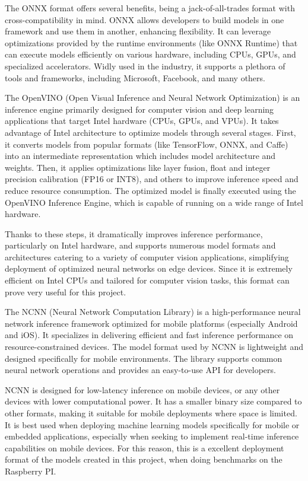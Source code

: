 \documentclass[12pt]{article}
\begin{document}
The ONNX format offers several benefits, being a jack-of-all-trades format with cross-compatibility in mind. ONNX allows developers to build models in one framework and use them in another, enhancing flexibility. It can leverage optimizations provided by the runtime environments (like ONNX Runtime) that can execute models efficiently on various hardware, including CPUs, GPUs, and specialized accelerators. Widly used in the industry, it supports a plethora of tools and frameworks, including Microsoft, Facebook, and many others.

The OpenVINO (Open Visual Inference and Neural Network Optimization) is an inference engine primarily designed for computer vision and deep learning applications that target Intel hardware (CPUs, GPUs, and VPUs). It takes advantage of Intel architecture to optimize models through several stages. First, it converts models from popular formats (like TensorFlow, ONNX, and Caffe) into an intermediate representation which includes model architecture and weights. Then, it applies optimizations like layer fusion, float and integer precision calibration (FP16 or INT8), and others to improve inference speed and reduce resource consumption. The optimized model is finally executed using the OpenVINO Inference Engine, which is capable of running on a wide range of Intel hardware.

Thanks to these steps, it dramatically improves inference performance, particularly on Intel hardware, and supports numerous model formats and architectures catering to a variety of computer vision applications, simplifying deployment of optimized neural networks on edge devices. Since it is extremely efficient on Intel CPUs and tailored for computer vision tasks, this format can prove very useful for this project.

The NCNN (Neural Network Computation Library) is a high-performance neural network inference framework optimized for mobile platforms (especially Android and iOS). It specializes in delivering efficient and fast inference performance on resource-constrained devices. The model format used by NCNN is lightweight and designed specifically for mobile environments. The library supports common neural network operations and provides an easy-to-use API for developers.

NCNN is designed for low-latency inference on mobile devices, or any other devices with lower computational power. It has a smaller binary size compared to other formats, making it suitable for mobile deployments where space is limited. It is best used when deploying machine learning models specifically for mobile or embedded applications, especially when seeking to implement real-time inference capabilities on mobile devices. For this reason, this is a excellent deployment format of the models created in this project, when doing benchmarks on the Raspberry PI.
\end{document}
